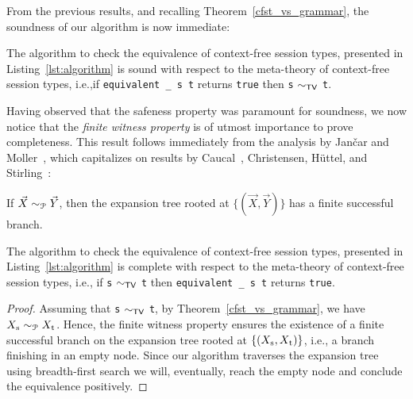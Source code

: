 From the previous results, and recalling Theorem~\ref{cfst_vs_grammar},
the soundness of our algorithm is now immediate:

\begin{theorem}
	The algorithm to check the equivalence of context-free session types,
	presented in Listing~\ref{lst:algorithm} is sound with respect to the
	meta-theory of context-free session types, i.e.,\linebreak if
	\lstinline|equivalent _ s t| returns
	\lstinline|true| then \lstinline|s| $\sim_{\mathsf{TV}}$ \lstinline|t|.
\end{theorem}

Having observed that the safeness property was paramount for soundness,
we now notice that the \emph{finite witness property} is of utmost
importance to prove completeness. This result follows immediately from the
 analysis by Jan{\v{c}}ar and Moller~\cite{janvcar1999techniques}, which
 capitalizes on results by
Caucal~\cite{caucal1986decidabilite}, Christensen, H{\"{u}}ttel, and
Stirling~\cite{DBLP:journals/iandc/ChristensenHS95}:

\begin{proposition} 
\label{finite_witness}
	If $\vec X \sim_{\mathcal{P}} \vec Y$, then the expansion tree rooted at
	$\{(\vec X, \vec Y)\}$ has a finite successful branch.
\end{proposition}



\begin{theorem}
	The algorithm to check the equivalence of context-free session types,
	presented in Listing~\ref{lst:algorithm} is complete with respect to the
	meta-theory of context-free session types, i.e., \linebreak if
	\lstinline|s| $\sim_{\mathsf{TV}}$ \lstinline|t| then
	\lstinline|equivalent _ s t| returns \lstinline|true|.
\end{theorem}

\begin{proof}
	Assuming that \lstinline|s| $\sim_{\mathsf{TV}}$ \lstinline|t|, by
	Theorem~\ref{cfst_vs_grammar}, we
	have $X_{\text{\lstinline|s|}} \ProdEquiv X_{\text{\lstinline|t|}}$.
	Hence, the finite witness property
	ensures the existence of a finite successful branch on the expansion
	tree rooted at $\{(X_{\text{\lstinline|s|}},X_{\text{\lstinline|t|}})\}$,
	i.e., a branch finishing in an empty node.
	Since our algorithm traverses
	the expansion tree using breadth-first search we will, eventually,
	reach the empty node and conclude the equivalence positively.
\end{proof}
